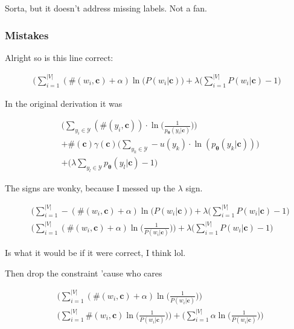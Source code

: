 \documentclass{article}
\newcommand{\vtheta}{\boldsymbol{\theta}}
\newcommand{\model}{p_{\vtheta}}
\newcommand{\context}{\boldsymbol{c}}
\begin{document}
		Sorta, but it doesn't address missing labels. Not a fan. 
		
		\subsubsection{Mistakes}
		
			Alright so is this line correct:
		
			\begin{align}
				\bigg( \sum^{|V|}_{i=1} (\#(w_i, \context) + \alpha)\ln(P(w_i|\context)\bigg) + \lambda\bigg(\sum^{|V|}_{i=1} P(w_i|\context) - 1 \bigg)
			\end{align}
		
			In the original derivation it was
		
			\begin{align}
				&\bigg(\sum_{y_i\in\mathcal{Y}} (\#(y_i, \context))\cdot  \ln\bigg(\frac{1}{\model(y_i|\context)} 	\bigg)\bigg) \\
				&+ \#(\context)\gamma(\context)\bigg(\sum_{y_k\in\mathcal{Y}} - u(y_k)\cdot\ln(\model(y_k|\context))\bigg) \\
				&+ \bigg(\lambda\sum_{y_l\in\mathcal{Y}} \model(y_l|\context) -1\bigg) 
			\end{align}	
		
			The signs are wonky, because I messed up the $\lambda$ sign. 
		
			\begin{align}
				&\bigg( \sum^{|V|}_{i=1} -(\#(w_i, \context) + \alpha)\ln(P(w_i|\context)\bigg) + \lambda\bigg(\sum^{|V|}_{i=1} P(w_i|\context) - 1 \bigg)\\
				&\bigg( \sum^{|V|}_{i=1} (\#(w_i, \context) + \alpha)\ln\bigg(\frac{1}{P(w_i|\context)}\bigg)\bigg) + \lambda\bigg(\sum^{|V|}_{i=1} P(w_i|\context) - 1 \bigg)
			\end{align}
			
			Is what it would be if it were correct, I think lol. 
			
			Then drop the constraint 'cause who cares
			
			\begin{align}
				&\bigg( \sum^{|V|}_{i=1} (\#(w_i, \context) + \alpha)\ln\bigg(\frac{1}{P(w_i|\context)}\bigg)\bigg)\\
				&\bigg( \sum^{|V|}_{i=1} \#(w_i, \context)\ln\bigg(\frac{1}{P(w_i|\context)}\bigg)\bigg) + \bigg( \sum^{|V|}_{i=1} \alpha\ln\bigg(\frac{1}{P(w_i|\context)}\bigg)\bigg)
			\end{align}
			
\end{document}
